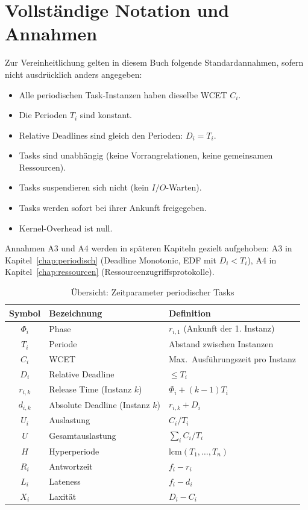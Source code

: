 ﻿\documentclass[a4paper,12pt]{report}
\theoremstyle{definition}
\begin{document}
\section{Vollständige Notation und Annahmen}

Zur Vereinheitlichung gelten in diesem Buch folgende Standardannahmen,
sofern nicht ausdrücklich anders angegeben:

\begin{itemize}
	\item[\textbf{A1}] Alle periodischen Task-Instanzen haben dieselbe WCET $C_i$.
	\item[\textbf{A2}] Die Perioden $T_i$ sind konstant.
	\item[\textbf{A3}] Relative Deadlines sind gleich den Perioden: $D_i = T_i$.
	\item[\textbf{A4}] Tasks sind unabhängig (keine Vorrangrelationen, keine gemeinsamen Ressourcen).
	\item[\textbf{A5}] Tasks suspendieren sich nicht (kein $I/O$-Warten).
	\item[\textbf{A6}] Tasks werden sofort bei ihrer Ankunft freigegeben.
	\item[\textbf{A7}] Kernel-Overhead ist null.
\end{itemize}

Annahmen A3 und A4 werden in späteren Kapiteln gezielt aufgehoben:
A3 in Kapitel~\ref{chap:periodisch} (Deadline Monotonic, EDF mit $D_i < T_i$),
A4 in Kapitel~\ref{chap:ressourcen} (Ressourcenzugriffsprotokolle).

\begin{table}[H]
	\centering
	\caption{Übersicht: Zeitparameter periodischer Tasks}
	\begin{tabular}{cll}
		\toprule
		\textbf{Symbol} & \textbf{Bezeichnung} & \textbf{Definition} \\
		\midrule
		$\Phi_i$ & Phase & $r_{i,1}$ (Ankunft der 1. Instanz) \\
		$T_i$ & Periode & Abstand zwischen Instanzen \\
		$C_i$ & WCET & Max.\ Ausführungszeit pro Instanz \\
		$D_i$ & Relative Deadline & $\leq T_i$ \\
		$r_{i,k}$ & Release Time (Instanz $k$) & $\Phi_i + (k-1)T_i$ \\
		$d_{i,k}$ & Absolute Deadline (Instanz $k$) & $r_{i,k} + D_i$ \\
		$U_i$ & Auslastung & $C_i/T_i$ \\
		$U$ & Gesamtauslastung & $\sum_i C_i/T_i$ \\
		$H$ & Hyperperiode & $\mathrm{lcm}(T_1,\ldots,T_n)$ \\
		$R_i$ & Antwortzeit & $f_i - r_i$ \\
		$L_i$ & Lateness & $f_i - d_i$ \\
		$X_i$ & Laxität & $D_i - C_i$ \\
		\bottomrule
	\end{tabular}
\end{table}
\end{document}
